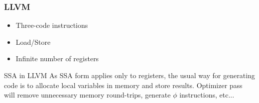 \documentclass{beamer}
\begin{document}
  \begin{frame}
  	\frametitle{LLVM}
  	\begin{itemize}
  		\item Three-code instructions
  		\item Load/Store
  		\item Infinite number of registers
  	\end{itemize}
  	\begin{block}{SSA in LLVM}
  		As SSA form applies only to registers, the usual way for generating code is to allocate local variables in memory and store results. Optimizer pass will remove unnecessary memory round-trips, generate $\phi$ instructions,  etc...
  	\end{block}
  \end{frame}
\end{document}
